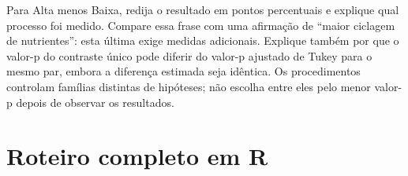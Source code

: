 Para Alta menos Baixa, redija o resultado em pontos percentuais e explique qual processo foi medido. Compare essa frase com uma afirmação de ``maior ciclagem de nutrientes'': esta última exige medidas adicionais. Explique também por que o valor-p do contraste único pode diferir do valor-p ajustado de Tukey para o mesmo par, embora a diferença estimada seja idêntica. Os procedimentos controlam famílias distintas de hipóteses; não escolha entre eles pelo menor valor-p depois de observar os resultados.
\clearpage
\section{Roteiro completo em R}

